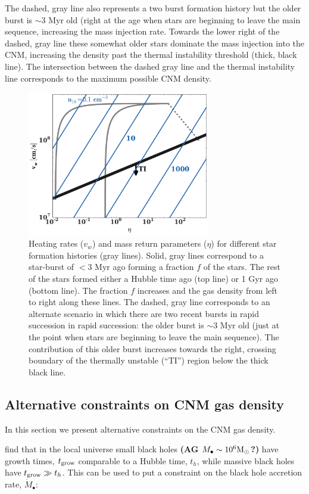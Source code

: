 \documentclass[usenatbib,fleqn]{mnras}
\newcommand{\Mbh}[1][]{M_{\bullet#1}}
\renewcommand{\th}{t_h}
\newcommand{\Msun}{{\rm M_\odot}}
\begin{document}
The dashed, gray line also represents a two burst formation history
but the older burst is $\sim 3$ Myr old (right at the age when stars
are beginning to leave the main sequence, increasing the mass
injection rate. Towards the lower right of the dashed, gray line these
somewhat older stars dominate the mass injection into the CNM,
increasing the density past the thermal instability threshold (thick,
black line). The intersection between the dashed gray line and the
thermal instability line corresponds to the maximum possible CNM
density.

\begin{figure} 
  \includegraphics[width=8cm]{cnm_plot.pdf}
  \caption{\label{fig:param} Heating rates ($v_w$) and mass return
    parameters ($\eta$) for different star formation histories (gray
    lines). Solid, gray lines correspond to a star-burst of $<3$ Myr
    ago forming a fraction $f$ of the stars. The rest of the stars
    formed either a Hubble time ago (top line) or 1 Gyr ago (bottom
    line). The fraction $f$ increases and the gas density from left to
    right along these lines. The dashed, gray line corresponds to an
    alternate scenario in which there are two recent bursts in rapid
    succession in rapid succession: the older burst is $\sim 3$ Myr
    old (just at the point when stars are beginning to leave the main
    sequence). The contribution of this older burst increases towards
    the right, crossing boundary of the thermally unstable (``TI'')
    region below the thick black line.}
\end{figure}


\subsection{Alternative constraints on CNM gas density}
In this section we present alternative constraints on the CNM gas
density.  

\citet{Heckman+2004} find that in the local universe small black
holes {\bf (AG $\Mbh\sim 10^6 \Msun$?)} have growth times, $t_{\rm grow}$
comparable to a Hubble time, $t_h$, while massive black holes have
$t_{\rm grow} \gg \th$. This can be used to put a constraint on the
black hole accretion rate, $\dot{M}_{\bullet}$:
\end{document}
